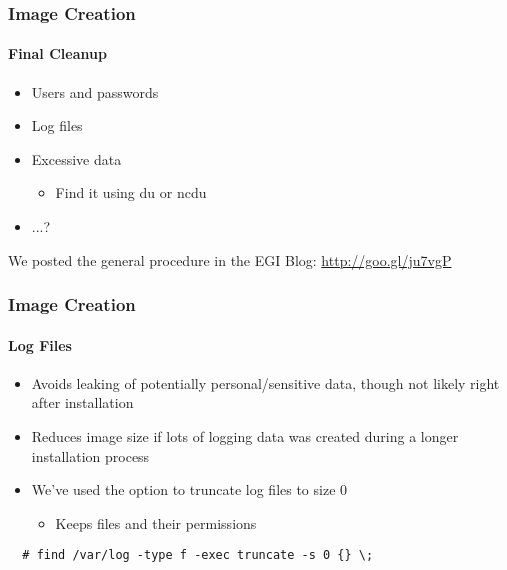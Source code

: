 \begin{frame}
\frametitle{Image Creation}
\framesubtitle{Final Cleanup}
\begin{itemize}
\item Users and passwords
\item Log files
\item Excessive data
  \begin{itemize}
  \item Find it using du or ncdu
  \end{itemize}
\item ...?
\end{itemize}
\hfill\scriptsize{We posted the general procedure in the EGI Blog: \url{http://goo.gl/ju7vgP}}
\end{frame}

\begin{frame}[fragile]
\frametitle{Image Creation}
\framesubtitle{Log Files}
\begin{itemize}
\item Avoids leaking of potentially personal/sensitive data, though
  not likely right after installation
\item Reduces image size if lots of logging data was created during a
  longer installation process
\item We've used the option to truncate log files to size 0
  \begin{itemize}
  \item Keeps files and their permissions
  \end{itemize}
\end{itemize}
\begin{lstlisting}
  # find /var/log -type f -exec truncate -s 0 {} \;
\end{lstlisting}
\end{frame}

